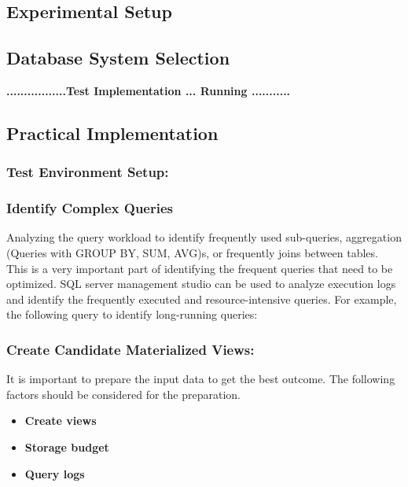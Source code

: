 \subsection{Experimental Setup}
\subsection{Database System Selection}



 \begin{center}
     \textbf{.................Test Implementation ... Running ...........}
 \end{center}

\subsection{Practical Implementation}
\subsubsection{Test Environment Setup:}
\subsubsection{Identify Complex Queries} Analyzing the query workload to identify frequently used sub-queries, aggregation (Queries with GROUP BY, SUM, AVG)s, or frequently joins between tables. This is a very important part of identifying the frequent queries that need to be optimized. SQL server management studio can be used to analyze execution logs and identify the frequently executed and resource-intensive queries. For example, the following query to identify long-running queries:



\subsubsection{ Create Candidate Materialized Views:} It is important to prepare the input data to get the best outcome. The following factors should be considered for the preparation. 

  \begin{itemize}
      \item \textbf{Create views}
      \item \textbf{Storage budget}
      \item \textbf{Query logs}
  \end{itemize}

